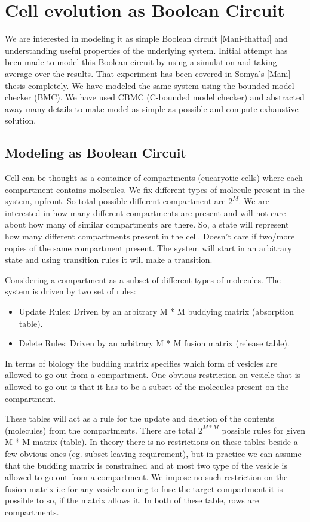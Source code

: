 \documentclass[preprint,12pt]{elsarticle}
\begin{document}
\section{Cell evolution as Boolean Circuit}
We are interested in modeling it as simple Boolean circuit [Mani-thattai] and understanding useful properties of the underlying system. Initial attempt has been made to model this Boolean circuit by using a simulation and taking average over the results. That experiment has been covered in Somya's [Mani] thesis completely. We have modeled the same system using the bounded model checker (BMC). We have used CBMC (C-bounded model checker) and abstracted away many details to make model as simple as possible and compute exhaustive solution. 

\subsection{Modeling as Boolean Circuit}
Cell can be thought as a container of compartments (eucaryotic cells) where each compartment contains molecules. We fix different types of molecule present in the system, upfront. So total possible different compartment are $2^{M}$. We are interested in how many different compartments are present and will not care about how many of similar compartments are there. So, a state will represent how many different compartments present in the cell. Doesn't care if two/more copies of the same compartment present. The system will start in an arbitrary state and using transition rules it will make a transition.

Considering a compartment as a subset of different types of molecules. The system is driven by two set of rules:
\begin{itemize}
\item Update Rules: Driven by an arbitrary M * M buddying matrix (absorption table).
\item Delete Rules: Driven by an arbitrary M * M fusion matrix (release table).
\end{itemize}
In terms of biology the budding matrix specifies which form of vesicles are allowed to go out from a compartment. One obvious restriction on vesicle that is allowed to go out is that it has to be a subset of the molecules present on the compartment. 


These tables will act as a rule for the update and deletion of the contents (molecules) from the compartments. There are total $2^{M * M}$ possible rules for given M * M matrix (table). In theory there is no restrictions on these tables beside a few obvious ones (eg. subset leaving requirement), but in practice we can assume that the budding matrix is constrained and at most two type of the vesicle is allowed to go out from a compartment. We impose no such restriction on the fusion matrix i.e for any vesicle coming to fuse the target compartment it is possible to so, if the matrix allows it. In both of these table, rows are compartments.
\end{document}
